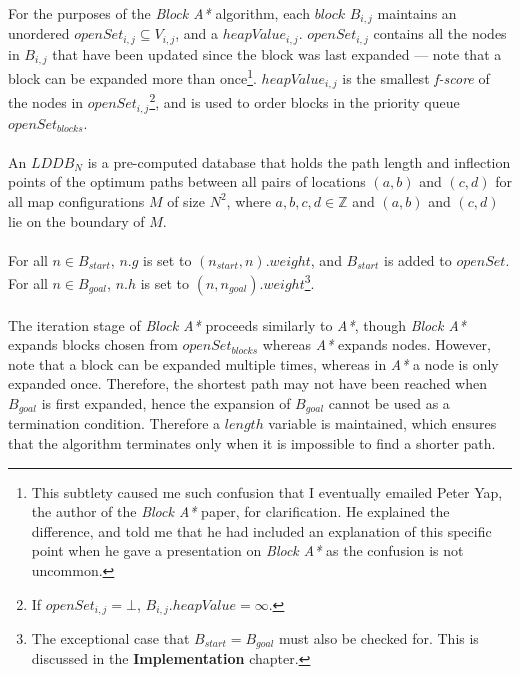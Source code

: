 \documentclass[12pt,notitlepage]{report}
\begin{document}
\noindent
For the purposes of the {\em Block A*} algorithm, each $block$ $B_{i,j}$ maintains an unordered $openSet_{i,j} \subseteq V_{i,j}$, and a $heapValue_{i,j}$. $openSet_{i,j}$ contains all the nodes in $B_{i,j}$ that have been updated since the block was last expanded --- note that a block can be expanded more than once\footnote{This subtlety caused me such confusion that I eventually emailed Peter Yap, the author of the {\em Block A*} paper, for clarification. He explained the difference, and told me that he had included an explanation of this specific point when he gave a presentation on {\em Block A*} as the confusion is not uncommon.}. $heapValue_{i,j}$ is the smallest {\em f-score} of the nodes in $openSet_{i,j}$\footnote{If $openSet_{i,j} = \bot$, $B_{i,j}.heapValue = \infty$.}, and is used to order blocks in the priority queue $openSet_{blocks}$.\\


\\
\noindent
An $LDDB_{N}$ is a pre-computed database that holds the path length and inflection points of the optimum paths between all pairs of locations $(a,b)$ and $(c,d)$ for all map configurations $M$ of size $N^{2}$, where $a,b,c,d \in \mathbb{Z}$ and $(a,b)$ and $(c,d)$ lie on the boundary of $M$.\\

\\
\noindent
For all $n \in B_{start}$, $n.g$ is set to $(n_{start},n).weight$, and $B_{start}$ is added to $openSet$. For all $n \in B_{goal}$, $n.h$ is set to $(n,n_{goal}).weight$\footnote{The exceptional case that $B_{start} = B_{goal}$ must also be checked for. This is discussed in the {\bfseries Implementation} chapter.}.\\

\\
\noindent
The iteration stage of {\em Block A*} proceeds similarly to {\em A*}, though {\em Block A*} expands blocks chosen from $openSet_{blocks}$ whereas {\em A*} expands nodes. However, note that a block can be expanded multiple times, whereas in {\em A*} a node is only expanded once. Therefore, the shortest path may not have been reached when $B_{goal}$ is first expanded, hence the expansion of $B_{goal}$ cannot be used as a termination condition. Therefore a $length$ variable is maintained, which ensures that the algorithm terminates only when it is impossible to find a shorter path.\\
\end{document}

